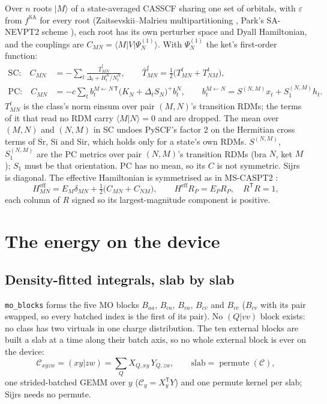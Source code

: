 \documentclass[11pt]{article}
\newcommand{\code}[1]{\texttt{#1}}
\newcommand{\eps}{\varepsilon}
\newcommand{\Heff}{H^{\mathrm{eff}}}
\newcommand{\T}{\mathsf T}
\begin{document}
Over $n$ roots $|M\rangle$ of a state-averaged CASSCF sharing one set of
orbitals, with $\eps$ from $f^{\mathrm{SA}}$ for every root
(Zaitsevskii--Malrieu multipartitioning \cite{zaitsevskii1995},
Park's SA-NEVPT2 scheme \cite{park2020}), each root has its own perturber
space and Dyall Hamiltonian, and the couplings are
$C_{MN} = \langle M|V|\Psi^{(1)}_N\rangle$. With $\Psi^{(1)}_N$ the ket's
first-order function:
\begin{align}
  \text{SC:}\quad C_{MN} &= -\sum_t \frac{\bar T^t_{MN}}{\Delta_t + H^N_t/N^N_t},
  \qquad \bar T^t_{MN} = \tfrac12\bigl(T^t_{MN} + T^t_{NM}\bigr),
  \label{eq:qd-sc}\\
  \text{PC:}\quad C_{MN} &= -c\sum_t b^{M\leftarrow N\,\T}_t
    \bigl(K_N + \Delta_t S_N\bigr)^{+} b^N_t,\qquad
  b^{M\leftarrow N}_t = S^{(N,M)} x_t + S_1^{(N,M)} h_t.
  \label{eq:qd-pc}
\end{align}
$T^t_{MN}$ is the class's norm einsum over pair $(M,N)$'s transition RDMs;
the terms of it that read no RDM carry $\langle M|N\rangle = 0$ and are
dropped. The mean over $(M,N)$ and $(N,M)$ in SC undoes PySCF's factor 2 on
the Hermitian cross terms of Sr, Si and Sir, which holds only for a state's
own RDMs. $S^{(N,M)}$, $S_1^{(N,M)}$ are the PC metrics over pair $(N,M)$'s
transition RDMs (bra $N$, ket $M$); $S_1$ must be that orientation. PC has
no mean, so its $C$ is not symmetric. Sijrs is diagonal. The effective
Hamiltonian is symmetrised as in MS-CASPT2 \cite{park2020}:
\begin{equation}
  \Heff_{MN} = E_M\delta_{MN} + \tfrac12\bigl(C_{MN} + C_{NM}\bigr),\qquad
  \Heff R_P = E_P R_P,\quad R^\T R = 1,
  \label{eq:heff}
\end{equation}
each column of $R$ signed so its largest-magnitude component is positive.

\section{The energy on the device}
\label{sec:energy}

\subsection{Density-fitted integrals, slab by slab}
\label{sec:df}

\code{mo\_blocks} forms the five MO blocks $B_{aa}$, $B_{ca}$, $B_{va}$,
$B_{cv}$ and $B_{vc}$ ($B_{cv}$ with its pair swapped, so every batched
index is the first of its pair). No $(Q|vv)$ block exists: no class has two
virtuals in one charge distribution. The ten external blocks are built a
slab at a time along their batch axis, so no whole external block is ever
on the device:
\begin{equation}
  \mathcal C_{xyzw} = (xy|zw) = \sum_Q X_{Q,xy}\,Y_{Q,zw},\qquad
  \text{slab} = \operatorname{permute}(\mathcal C),
\end{equation}
one strided-batched GEMM over $y$ ($\mathcal C_y = X_y^\T Y$) and one
permute kernel per slab; Sijrs needs no permute.
\end{document}
